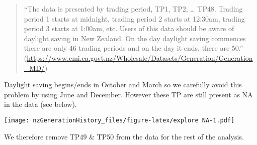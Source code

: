 \documentclass[]{article}
\newenvironment{Shaded}{\begin{snugshade}}{\end{snugshade}}
\newcommand{\KeywordTok}[1]{\textcolor[rgb]{0.13,0.29,0.53}{\textbf{#1}}}
\newcommand{\DataTypeTok}[1]{\textcolor[rgb]{0.13,0.29,0.53}{#1}}
\newcommand{\StringTok}[1]{\textcolor[rgb]{0.31,0.60,0.02}{#1}}
\newcommand{\CommentTok}[1]{\textcolor[rgb]{0.56,0.35,0.01}{\textit{#1}}}
\newcommand{\OperatorTok}[1]{\textcolor[rgb]{0.81,0.36,0.00}{\textbf{#1}}}
\newcommand{\ErrorTok}[1]{\textcolor[rgb]{0.64,0.00,0.00}{\textbf{#1}}}
\newcommand{\NormalTok}[1]{#1}
\begin{document}
\begin{quote}
``The data is presented by trading period, TP1, TP2, \ldots{} TP48.
Trading period 1 starts at midnight, trading period 2 starts at 12:30am,
trading period 3 starts at 1:00am, etc. Users of this data should be
aware of daylight saving in New Zealand. On the day daylight saving
commences there are only 46 trading periods and on the day it ends,
there are 50.''
(\url{https://www.emi.ea.govt.nz/Wholesale/Datasets/Generation/Generation_MD/})
\end{quote}

Daylight saving begins/ends in October and March so we carefully avoid
this problem by using June and December. However these TP are still
present as NA in the data (see below).

\begin{Shaded}
\end{Shaded}

\texttt{[image: nzGenerationHistory\_files/figure-latex/explore NA-1.pdf]}

We therefore remove TP49 \& TP50 from the data for the rest of the
analysis.
\end{document}
